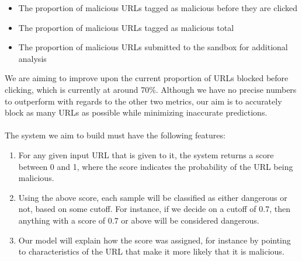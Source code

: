 \documentclass[cs,proposal]{hmcclinic}
\begin{document}
\begin{itemize} \itemsep0em
\item The proportion of malicious URLs tagged as malicious before they are clicked
\item The proportion of malicious URLs tagged as malicious total
\item The proportion of malicious URLs submitted to the sandbox for additional analysis
\end{itemize}

We are aiming to improve upon the current proportion of URLs blocked before clicking, which is currently at around 70\%. Although we have no precise numbers to outperform with regards to the other two metrics, our aim is to accurately block as many URLs as possible while minimizing inaccurate predictions.
\\\\
The system we aim to build must have the following features:

\begin{enumerate} \itemsep0em
\item For any given input URL that is given to it, the system returns a score between 0 and 1, where the score indicates the probability of the URL being malicious.
\item Using the above score, each sample will be classified as either dangerous or not, based on some cutoff. For instance, if we decide on a cutoff of 0.7, then anything with a score of 0.7 or above will be considered dangerous.
\item Our model will explain how the score was assigned, for instance by pointing to characteristics of the URL that make it more likely that it is malicious.
\end{enumerate}

\newpage





\end{document}

